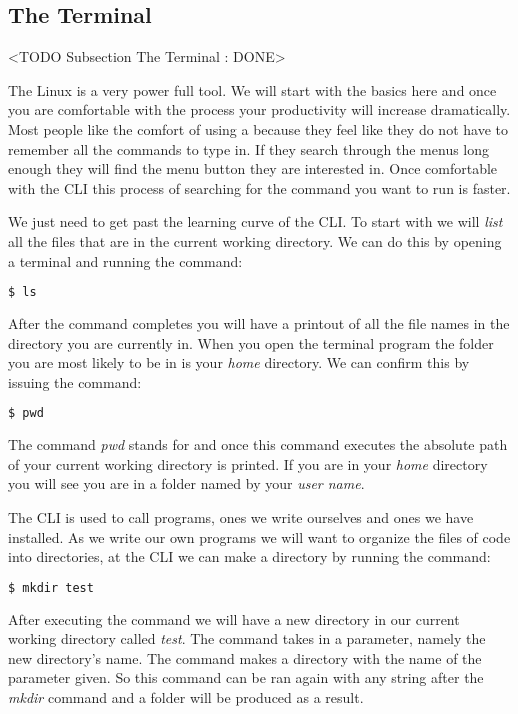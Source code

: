 \subsection{The Terminal}
	<TODO Subsection The Terminal : DONE>
	
The Linux  is a very power full tool. We will start with the basics here and once you are comfortable with the process your productivity will increase dramatically. Most people like the comfort of using a  because they feel like they do not have to remember all the commands to type in. If they search through the menus long enough they will find the menu button they are interested in. Once comfortable with the \ac{CLI} this process of searching for the command you want to run is faster. 

We just need to get past the learning curve of the \ac{CLI}. To start with we will \emph{list} all the files that are in the current working directory. We can do this by opening a terminal and running the command:

\begin{lstlisting}[language=bash]
    $ ls
\end{lstlisting}	
	
After the command completes you will have a printout of all the file names in the directory you are currently in. When you open the terminal program the folder you are most likely to be in is your \emph{home} directory. We can confirm this by issuing the command:

\begin{lstlisting}[language=bash]
    $ pwd
\end{lstlisting}	

The command \emph{pwd} stands for \emph{} and once this command executes the absolute path of your current working directory is printed. If you are in your \emph{home} directory you will see you are in a folder named by your \emph{user name}. 	
	
The \ac{CLI} is used to call programs, ones we write ourselves and ones we have installed. As we write our own programs we will want to organize the files of code into directories, at the \ac{CLI} we can make a directory by running the command:

\begin{lstlisting}[language=bash] 
    $ mkdir test
\end{lstlisting}	

After executing the command we will have a new directory in our current working directory called \emph{test}. The \emph{} command takes in a parameter, namely the new directory's name. The command makes a directory with the name of the parameter given. So this command can be ran again with any string after the \emph{mkdir} command and a folder will be produced as a result. 

